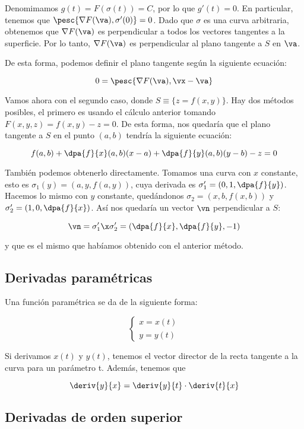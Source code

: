 \documentclass[12pt,a4paper,titlepage]{apuntes}
\begin{document}
Denomimamos $g(t) = F(\sigma(t)) = C$, por lo que $g'(t) =0$. En particular, tenemos que $\pesc{\nabla F (\va),\sigma ' (0)}= 0$. Dado que $\sigma$ es una curva arbitraria, obtenemos que $\nabla F (\va)$ es perpendicular a todos los vectores tangentes a la superficie. Por lo tanto, $\nabla F (\va)$ es perpendicular al plano tangente a $S$ en $\va$.

De esta forma, podemos definir el plano tangente según la siguiente ecuación:

\[ 0 =\pesc{\nabla F(\va), \vx -\va} \]

Vamos ahora con el segundo caso, donde $S\equiv \{z=f(x,y) \}$. Hay dos métodos posibles, el primero es usando el cálculo anterior tomando $F(x,y,z) = f(x,y) - z = 0$. De esta forma, nos quedaría que el plano tangente a $S$ en el punto $(a,b)$ tendría la siguiente ecuación:

\[ f(a,b) + \dpa{f}{x} (a,b) (x-a)+\dpa{f}{y}(a,b) (y-b) - z = 0 \]

También podemos obtenerlo directamente. Tomamos una curva con $x$ constante, esto es $\sigma_1(y) = (a,y, f(a,y))$, cuya derivada es $\sigma_1'=(0,1,\dpa{f}{y})$. Hacemos lo mismo con $y$ constante, quedándonos $\sigma_2 = (x, b, f(x,b))$ y $\sigma_2 ' = (1, 0, \dpa{f}{x})$. Así nos quedaría un vector $\vn$ perpendicular a $S$:

\[ \vn = \sigma_1'\x\sigma_2' = \left(\dpa{f}{x}, \dpa{f}{y}, -1\right) \]

y que es el mismo que habíamos obtenido con el anterior método.

\subsection{Derivadas paramétricas}

Una función paramétrica se da de la siguiente forma:

\[ \left\lbrace \begin{matrix}
x = x(t) \\ y = y(t)
\end{matrix}\right. \]

Si derivamos $x(t)$ y $y(t)$, tenemos el vector director de la recta tangente a la curva para un parámetro t. Además, tenemos que

\[ \deriv{y}{x} = \deriv{y}{t} \cdot \deriv{t}{x} \]

\subsection{Derivadas de orden superior}
\end{document}
